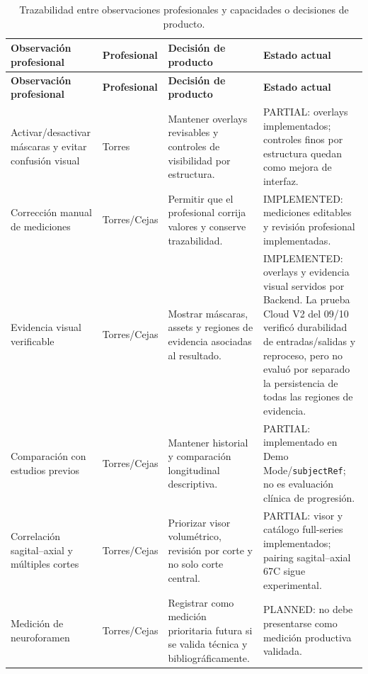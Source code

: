{\scriptsize
\setlength{\LTleft}{0pt}
\setlength{\LTright}{0pt}
\setlength{\tabcolsep}{3pt}
\renewcommand{\arraystretch}{1.18}
\begin{longtable}{>{\raggedright\arraybackslash}p{} >{\raggedright\arraybackslash}p{} >{\raggedright\arraybackslash}p{} >{\raggedright\arraybackslash}p{}}
\caption{Trazabilidad entre observaciones profesionales y capacidades o decisiones de producto.}\label{tab:res-cambios-producto-validacion-profesional}\\
\hline
\textbf{Observación profesional} & \textbf{Profesional} & \textbf{Decisión de producto} & \textbf{Estado actual} \\
\hline
\endfirsthead
\hline
\textbf{Observación profesional} & \textbf{Profesional} & \textbf{Decisión de producto} & \textbf{Estado actual} \\
\hline
\endhead
\hline
\endfoot
Activar/desactivar máscaras y evitar confusión visual & Torres & Mantener overlays revisables y controles de visibilidad por estructura. & PARTIAL: overlays implementados; controles finos por estructura quedan como mejora de interfaz. \\
Corrección manual de mediciones & Torres/Cejas & Permitir que el profesional corrija valores y conserve trazabilidad. & IMPLEMENTED: mediciones editables y revisión profesional implementadas. \\
Evidencia visual verificable & Torres/Cejas & Mostrar máscaras, assets y regiones de evidencia asociadas al resultado. & IMPLEMENTED: overlays y evidencia visual servidos por Backend. La prueba Cloud V2 del 09/10 verificó durabilidad de entradas/salidas y reproceso, pero no evaluó por separado la persistencia de todas las regiones de evidencia. \\
Comparación con estudios previos & Torres/Cejas & Mantener historial y comparación longitudinal descriptiva. & PARTIAL: implementado en Demo Mode/\texttt{subjectRef}; no es evaluación clínica de progresión. \\
Correlación sagital--axial y múltiples cortes & Torres/Cejas & Priorizar visor volumétrico, revisión por corte y no solo corte central. & PARTIAL: visor y catálogo full-series implementados; pairing sagital--axial 67C sigue experimental. \\
Medición de neuroforamen & Torres/Cejas & Registrar como medición prioritaria futura si se valida técnica y bibliográficamente. & PLANNED: no debe presentarse como medición productiva validada. \\

\end{longtable}}
